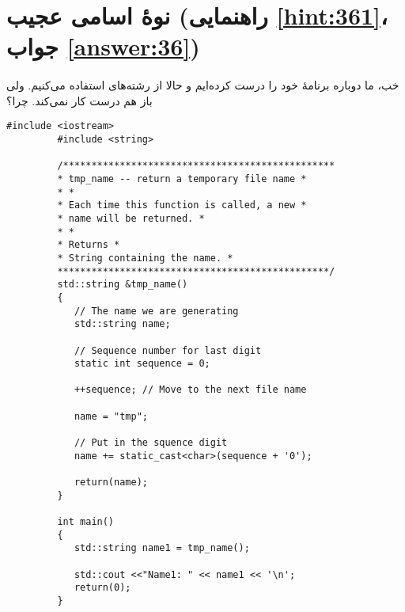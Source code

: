 \section[نوهٔ اسامی عجیب]{نوهٔ اسامی عجیب \protect{} (راهنمایی \ref{hint:361}، جواب \ref{answer:36})}
\paragraph{}\label{prog:60}
خب، ما دوباره برنامهٔ خود را درست کرده‌ایم و حالا از رشته‌های  استفاده می‌کنیم. ولی باز هم درست کار نمی‌کند. چرا؟

\begin{LTR}
    \begin{lstlisting}[style=C++Style]
         #include <iostream>
         #include <string>

         /************************************************
         * tmp_name -- return a temporary file name *
         * *
         * Each time this function is called, a new *
         * name will be returned. *
         * *
         * Returns *
         * String containing the name. *
         ************************************************/
         std::string &tmp_name()
         {
         	// The name we are generating
         	std::string name;

         	// Sequence number for last digit
         	static int sequence = 0;

         	++sequence; // Move to the next file name

         	name = "tmp";

         	// Put in the squence digit
         	name += static_cast<char>(sequence + '0');

         	return(name);
         }

         int main()
         {
         	std::string name1 = tmp_name();

         	std::cout <<"Name1: " << name1 << '\n';
         	return(0);
         }
    \end{lstlisting}
\end{LTR}